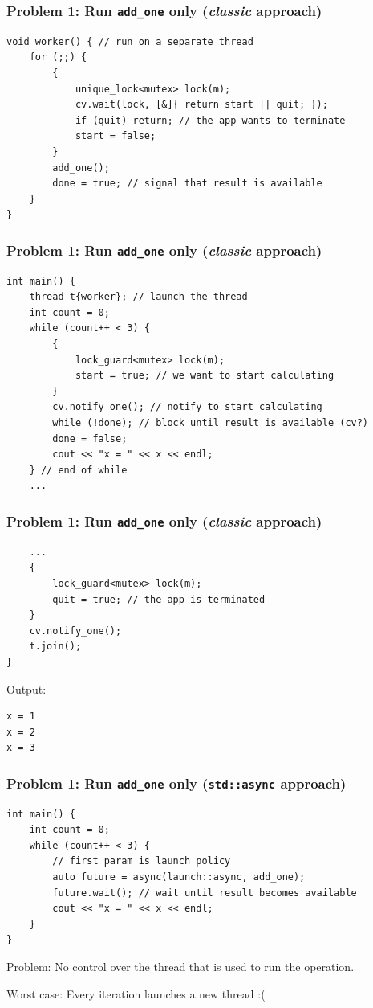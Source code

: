 \documentclass[12pt,aspectratio=169]{beamer}
\begin{document}
\begin{frame}[fragile]
\frametitle{Problem 1: Run \lstinline{add_one} only (\textit{classic} approach)}

\begin{lstlisting}
void worker() { // run on a separate thread
    for (;;) {
        {
            unique_lock<mutex> lock(m);
            cv.wait(lock, [&]{ return start || quit; });
            if (quit) return; // the app wants to terminate
            start = false;
        }
        add_one();
        done = true; // signal that result is available
    }
}
\end{lstlisting}

\end{frame}

\begin{frame}[fragile]
\frametitle{Problem 1: Run \lstinline{add_one} only (\textit{classic} approach)}

\begin{lstlisting}
int main() {
    thread t{worker}; // launch the thread
    int count = 0;
    while (count++ < 3) {
        {
            lock_guard<mutex> lock(m);
            start = true; // we want to start calculating
        }
        cv.notify_one(); // notify to start calculating
        while (!done); // block until result is available (cv?)
        done = false;
        cout << "x = " << x << endl;
    } // end of while
    ...
\end{lstlisting}

\end{frame}

\begin{frame}[fragile]
\frametitle{Problem 1: Run \lstinline{add_one} only (\textit{classic} approach)}

\begin{lstlisting}
    ...
    {
        lock_guard<mutex> lock(m);
        quit = true; // the app is terminated
    }
    cv.notify_one();
    t.join();
}
\end{lstlisting}
\bigskip

Output:
\begin{verbatim}
x = 1
x = 2
x = 3
\end{verbatim}
\end{frame}

\begin{frame}[fragile]
\frametitle{Problem 1: Run \lstinline{add_one} only (\lstinline{std::async} approach)}

\begin{lstlisting}
int main() {
    int count = 0;
    while (count++ < 3) {
        // first param is launch policy
        auto future = async(launch::async, add_one);
        future.wait(); // wait until result becomes available
        cout << "x = " << x << endl;
    }
}
\end{lstlisting}
\bigskip

Problem: No control over the thread that is used to run the operation.

Worst case: Every iteration launches a new thread :(
\end{frame}
\end{document}
